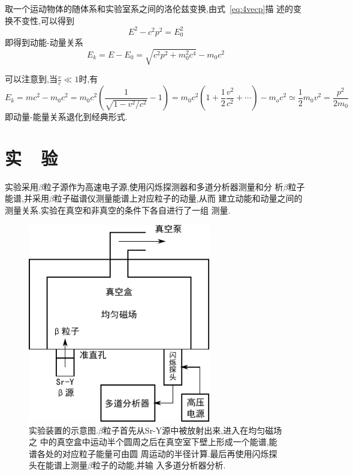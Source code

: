 \documentclass[aps,pre,12pt,preprint,onecolumn,showpacs,showkeys]{revtex4-1}
\begin{document}
取一个运动物体的随体系和实验室系之间的洛伦兹变换,由式~\ref{eq:4vecp}描
述的变换不变性,可以得到
\begin{equation}
  \label{eq:E-P}
  E^2 - c^2p^2 = E_0^2
\end{equation}
即得到动能-动量关系
\begin{equation}
  \label{eq:Ek-P}
  E_k = E - E_0 = \sqrt{c^2p^2 + m_0^2c^4} - m_0c^2
\end{equation}

可以注意到,当$\frac{v}{c} \ll 1$时,有
\begin{equation}
  \label{eq:classical}
  E_k = mc^2 - m_0c^2 = m_0c^2(\frac{1}{\sqrt{1-v^2/c^2}} - 1) =
  m_0c^2(1 + \frac{1}{2}\frac{v^2}{c^2} + \cdots) - m_oc^2 \simeq
  \frac{1}{2}m_0v^2 = \frac{p^2}{2m_0}
\end{equation}
即动量-能量关系退化到经典形式.


\section{实~~验}

实验采用$\beta$粒子源作为高速电子源,使用闪烁探测器和多道分析器测量和分
析$\beta$粒子能谱,并采用$\beta$粒子磁谱仪测量能谱上对应粒子的动量,从而
建立动能和动量之间的测量关系.实验在真空和非真空的条件下各自进行了一组
测量.

\begin{figure}[htbp]
  \centering
\includegraphics[width=80mm]{drawing.pdf}
\caption{\label{fig:ins}%
实验装置的示意图.$\beta$粒子首先从Sr-Y源中被放射出来,进入在均匀磁场之%
中的真空盒中运动半个圆周之后在真空室下壁上形成一个能谱,能谱各处的对应粒子能量可由圆%
周运动的半径计算.最后再使用闪烁探头在能谱上测量$\beta$粒子的动能,并输%
入多道分析器分析.}
\end{figure}
\end{document}
